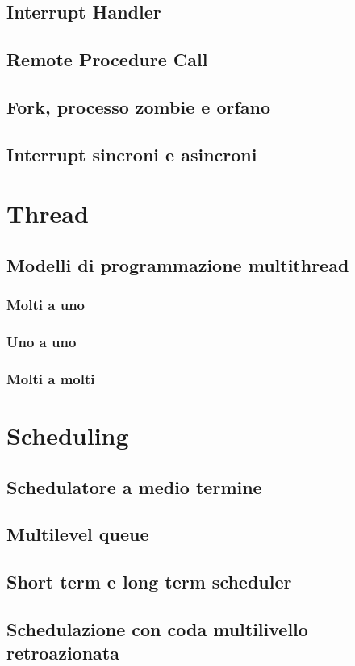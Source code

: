 \documentclass{report}
\begin{document}
\subsection{Interrupt Handler}
\subsection{Remote Procedure Call}
\subsection{Fork, processo zombie e orfano}
\subsection{Interrupt sincroni e asincroni}
\section{Thread}
\subsection{Modelli di programmazione multithread}
\subsubsection{Molti a uno}
\subsubsection{Uno a uno}
\subsubsection{Molti a molti}
\section{Scheduling}
\subsection{Schedulatore a medio termine}
\subsection{Multilevel queue}
\subsection{Short term e long term scheduler}
\subsection{Schedulazione con coda multilivello
retroazionata}
\end{document}
